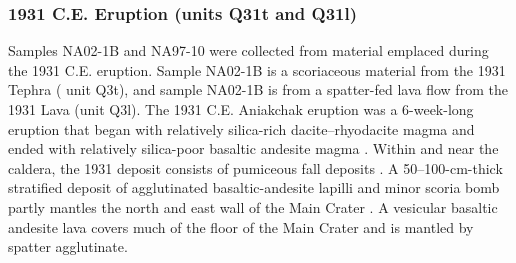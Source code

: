 \documentclass[draft]{agujournal2019}
\begin{document}
\subsubsection{1931 C.E. Eruption (units Q31t and Q31l)}
Samples NA02-1B and NA97-10 were collected from material emplaced during the 1931 C.E. eruption. Sample NA02-1B is a scoriaceous material from the 1931 Tephra ( unit Q3t), and sample NA02-1B is from a spatter-fed lava flow from the 1931 Lava (unit Q3l). The 1931 C.E. Aniakchak eruption was a 6-week-long eruption that began with relatively silica-rich dacite–rhyodacite magma and ended with relatively silica-poor basaltic andesite magma \cite{Nicholson2011a}. Within and near the caldera, the 1931 deposit consists of pumiceous fall deposits \cite{Nicholson2011a}. A 50–100-cm-thick stratified deposit of agglutinated basaltic-andesite lapilli and minor scoria bomb partly mantles the north and east wall of the Main Crater \cite{Bacon2014a}. A vesicular basaltic andesite lava covers much of the floor of the Main Crater and is mantled by spatter agglutinate. %
\end{document}
